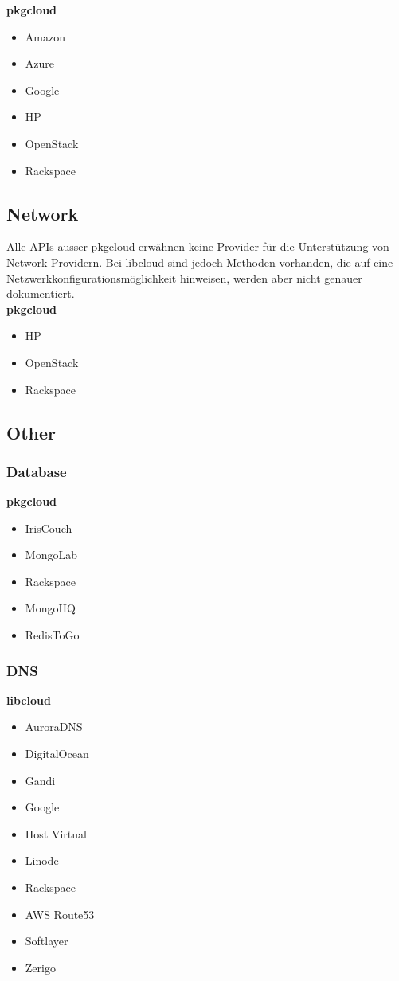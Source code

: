 \documentclass[11pt]{scrartcl}
\begin{document}
\textbf{pkgcloud}
\begin{itemize}
\item Amazon
\item Azure
\item Google
\item HP
\item OpenStack
\item Rackspace
\end{itemize}

\subsection{Network}
Alle APIs ausser pkgcloud erwähnen keine Provider für die Unterstützung von Network Providern. Bei libcloud sind jedoch Methoden vorhanden, die auf eine Netzwerkkonfigurationsmöglichkeit hinweisen, werden aber nicht genauer dokumentiert.\\

\textbf{pkgcloud}
\begin{itemize}
\item HP
\item OpenStack
\item Rackspace
\end{itemize}

\subsection{Other}
\subsubsection{Database}
\textbf{pkgcloud}
\begin{itemize}
\item IrisCouch
\item MongoLab
\item Rackspace
\item MongoHQ
\item RedisToGo
\end{itemize}

\subsubsection{DNS}
\textbf{libcloud}
\begin{itemize}
\item AuroraDNS
\item DigitalOcean
\item Gandi
\item Google
\item Host Virtual
\item Linode
\item Rackspace
\item AWS Route53
\item Softlayer
\item Zerigo
\end{itemize}
\end{document}
